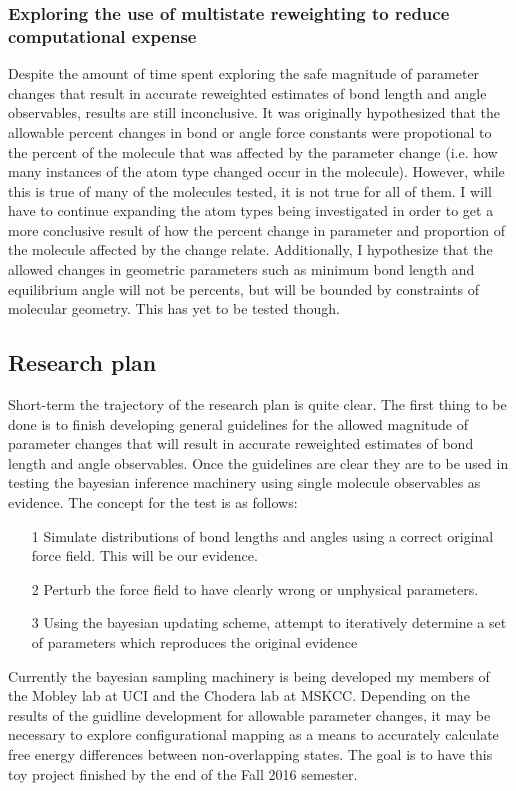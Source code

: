 \documentclass[rmp,nofootinbib,superscriptaddress,12pt,tightenlines,notitlepage]{revtex4-1}
\begin{document}
\subsubsection{Exploring the use of multistate reweighting to reduce computational expense}
Despite the amount of time spent exploring the safe magnitude of parameter changes that result in accurate reweighted estimates of bond length and angle 
observables, results are still inconclusive. It was originally hypothesized that the allowable percent changes in bond or angle force constants were 
propotional to the percent of the molecule that was affected by the parameter change (i.e. how many instances of the atom type changed occur in the molecule).
However, while this is true of many of the molecules tested, it is not true for all of them. I will have to continue expanding the atom types being 
investigated in order to get a more conclusive result of how the percent change in parameter and proportion of the molecule affected by the change relate. 
Additionally, I hypothesize that the allowed changes in geometric parameters such as minimum bond length and equilibrium angle will not be percents, but will
be bounded by constraints of molecular geometry. This has yet to be tested though. 

\subsection{Research plan}
Short-term the trajectory of the research plan is quite clear. The first thing to be done is to finish developing general guidelines for the allowed magnitude
of parameter changes that will result in accurate reweighted estimates of bond length and angle observables. Once the guidelines are clear they are to be 
used in testing the bayesian inference machinery using single molecule observables as evidence. The concept for the test is as follows:
\begin{itemize}
 \item [1] Simulate distributions of bond lengths and angles using a correct original force field. This will be our evidence.
 \item [2] Perturb the force field to have clearly wrong or unphysical parameters.
 \item [3] Using the bayesian updating scheme, attempt to iteratively determine a set of parameters which reproduces the original evidence
\end{itemize}
Currently the bayesian sampling machinery is being developed my members of the Mobley lab at UCI and the Chodera lab at MSKCC. Depending on the results of the
guidline development for allowable parameter changes, it may be necessary to explore configurational mapping as a means to accurately calculate free energy differences between non-overlapping states.\cite{mapping} The goal is to have this toy project finished by the end of the Fall 2016 semester. 
\end{document}
